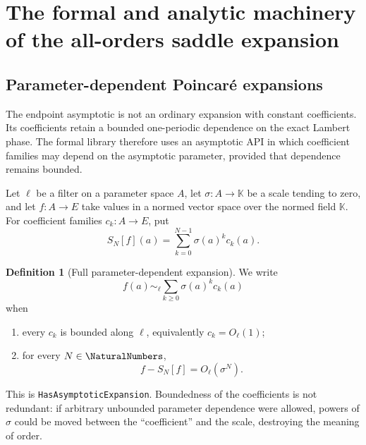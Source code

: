 \documentclass[11pt,oneside]{article}
\theoremstyle{definition}
\newtheorem{definition}[definition]{Definition}
\theoremstyle{remark}
\newcommand{\lean}[1]{%
  \ifmmode\text{\texttt{\detokenize{#1}}}\else\nolinkurl{#1}\fi}
\begin{document}
\section{The formal and analytic machinery of the all-orders saddle expansion}

\subsection{Parameter-dependent Poincar\'e expansions}
\label{integration:sec:poincare-api}

The endpoint asymptotic is not an ordinary expansion with constant coefficients.  Its
coefficients retain a bounded one-periodic dependence on the exact Lambert phase.  The
formal library therefore uses an asymptotic API in which coefficient families may depend on
the asymptotic parameter, provided that dependence remains bounded.

Let $\ell$ be a filter on a parameter space $A$, let $\sigma:A\to\mathbb K$ be a scale tending
to zero, and let $f:A\to E$ take values in a normed vector space over the normed field
$\mathbb K$.  For coefficient families $c_k:A\to E$, put
\begin{equation}
 S_N[f](a)=\sum_{k=0}^{N-1}\sigma(a)^k c_k(a).
 \label{integration:eq:parameter-partial-sum}
\end{equation}

\begin{definition}[Full parameter-dependent expansion]
\label{integration:def:parameter-expansion}
We write
\begin{equation}
 f(a)\sim_{\ell}\sum_{k\ge0}\sigma(a)^kc_k(a)
 \label{integration:eq:parameter-expansion-symbol}
\end{equation}
when
\begin{enumerate}
 \item every $c_k$ is bounded along $\ell$, equivalently $c_k=O_{\ell}(1)$;
 \item for every $N\in\NaturalNumbers$,
 \begin{equation}
  f-S_N[f]=O_{\ell}(\sigma^N).
  \label{integration:eq:parameter-expansion-remainder}
 \end{equation}
\end{enumerate}
\end{definition}

This is \lean{HasAsymptoticExpansion}.  Boundedness of the coefficients is not redundant: if
arbitrary unbounded parameter dependence were allowed, powers of $\sigma$ could be moved
between the ``coefficient'' and the scale, destroying the meaning of order.
\end{document}
